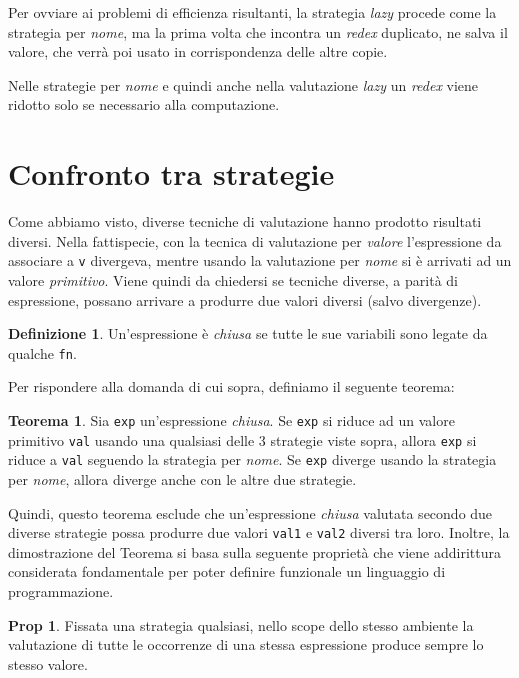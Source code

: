 \documentclass[12pt, a4paper]{report}
\theoremstyle{definition}
\newtheorem{definition}{Definizione}[section]
\newtheorem{theorem}{Teorema}[section]
\newtheorem{proposition}{Prop}[section]
\newcommand{\code}[1]{\texttt{#1}}
\begin{document}
Per ovviare ai problemi di efficienza risultanti, la strategia \emph{lazy} procede
come la strategia per \emph{nome}, ma la prima volta che incontra un \emph{redex}
duplicato, ne salva il valore, che verrà poi usato in corrispondenza delle altre
copie.

Nelle strategie per \emph{nome} e quindi anche nella valutazione \emph{lazy} un
\emph{redex} viene ridotto solo se necessario alla computazione.

\section{Confronto tra strategie}
Come abbiamo visto, diverse tecniche di valutazione hanno prodotto risultati
diversi. Nella fattispecie, con la tecnica di valutazione per \emph{valore}
l'espressione da associare a \code{v} divergeva, mentre usando la valutazione
per \emph{nome} si è arrivati ad un valore \emph{primitivo}. Viene quindi da
chiedersi se tecniche diverse, a parità di espressione, possano arrivare a
produrre due valori diversi (salvo divergenze).
\begin{definition}
    Un'espressione è \emph{chiusa} se tutte le sue variabili sono legate da
    qualche \code{fn}.
\end{definition}

Per rispondere alla domanda di cui sopra, definiamo il seguente teorema:
\begin{theorem}
    Sia \code{exp} un'espressione \emph{chiusa}. Se \code{exp} si riduce ad un
    valore primitivo \code{val} usando una qualsiasi delle 3 strategie viste
    sopra, allora \code{exp} si riduce a \code{val} seguendo la strategia per
    \emph{nome}. Se \code{exp} diverge usando la strategia per \emph{nome},
    allora diverge anche con le altre due strategie.
\end{theorem}

Quindi, questo teorema esclude che un'espressione \emph{chiusa} valutata secondo
due diverse strategie possa produrre due valori \code{val1} e \code{val2} diversi
tra loro. Inoltre, la dimostrazione del Teorema si basa sulla
seguente proprietà che viene addirittura considerata fondamentale per poter
definire funzionale un linguaggio di programmazione.

\begin{proposition}
    Fissata una strategia qualsiasi, nello scope dello stesso ambiente la
    valutazione di tutte le occorrenze di una stessa espressione produce sempre
    lo stesso valore.
\end{proposition}
\end{document}
